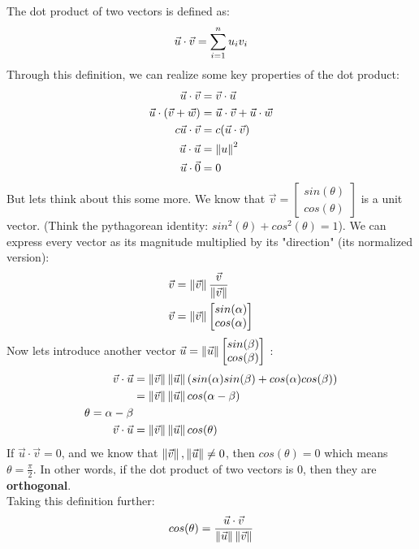 \documentclass[../main.tex]{subfiles}
\begin{document}
\noindent
The dot product of two vectors is defined as:
\begin{align}
	\vec{u} \cdot \vec{v} = \sum_{i=1}^{n} u_{i}v_{i} \notag
\end{align}
\noindent
Through this definition, we can realize some key properties of the dot product:
\begin{align}
	\vec{u} \cdot \vec{v} &= \vec{v} \cdot \vec{u} \notag \\
	\vec{u} \cdot (\vec{v} + \vec{w}) &= \vec{u} \cdot \vec{v} + \vec{u} \cdot \vec{w} \notag \\
	c\vec{u} \cdot \vec{v} &= c(\vec{u} \cdot \vec{v}) \notag \\
	\vec{u} \cdot \vec{u} &= \left\lVert u\right\rVert^2 \notag \\
	\vec{u} \cdot \vec{0} &= 0 \notag
\end{align}
\noindent
But lets think about this some more. We know that $\vec{v} = \begin{bmatrix} sin(\theta) \\ cos(\theta) \end{bmatrix}$ is a unit vector. (Think the pythagorean identity: $sin^{2}(\theta) + cos^{2}(\theta) = 1$). We can express every vector as its magnitude multiplied by its "direction" (its normalized version):
\begin{align}
	\vec{v} &= \left\lVert\vec{v}\right\rVert \frac{\vec{v}}{\left\lVert\vec{v}\right\rVert} \notag \\
	\vec{v} &= \left\lVert\vec{v}\right\rVert \begin{bmatrix} sin(\alpha) \\ cos(\alpha) \end{bmatrix} \notag
\end{align}
\noindent
Now lets introduce another vector $\vec{u} = \left\lVert\vec{u}\right\rVert \begin{bmatrix} sin(\beta) \\ cos(\beta) \end{bmatrix}$
:
\begin{align}
	\vec{v} \cdot \vec{u} &= \left\lVert\vec{v}\right\rVert\left\lVert\vec{u}\right\rVert (sin(\alpha)sin(\beta) + cos(\alpha)cos(\beta)) \notag \\
			      &= \left\lVert\vec{v}\right\rVert\left\lVert\vec{u}\right\rVert cos(\alpha - \beta) \notag \\
			      \theta = \alpha - \beta \notag \\
	\vec{v} \cdot \vec{u}  &= \left\lVert\vec{v}\right\rVert\left\lVert\vec{u}\right\rVert cos(\theta) \notag
\end{align}
\noindent
If $\vec{u} \cdot \vec{v} = 0$, and we know that $\left\lVert\vec{v}\right\rVert, \left\lVert\vec{u}\right\rVert \neq 0$, then $cos(\theta) = 0$ which means $\theta = \frac{\pi}{2}$. In other words, if the dot product of two vectors is $0$, then they are \textbf{orthogonal}. \\ 

\noindent
Taking this definition further:
\begin{align}
	cos(\theta) = \frac{\vec{u} \cdot \vec{v}}{\left\lVert\vec{u}\right\rVert\left\lVert\vec{v}\right\rVert} \notag
\end{align}
\end{document}
